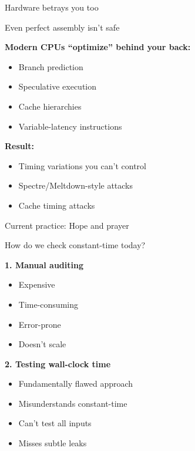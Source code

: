 \documentclass[aspectratio=169, lualatex, handout]{beamer}
\begin{document}
\begin{frame}{Hardware betrays you too}
	\begin{center}
		\Large
		Even perfect assembly isn't safe
	\end{center}
	\vspace{1em}
	\textbf{Modern CPUs ``optimize'' behind your back:}
	\begin{itemize}
		\item Branch prediction
		\item Speculative execution
		\item Cache hierarchies
		\item Variable-latency instructions
	\end{itemize}
	\vspace{0.5em}
	\textbf{Result:}
	\begin{itemize}
		\item Timing variations you can't control
		\item Spectre/Meltdown-style attacks
		\item Cache timing attacks
	\end{itemize}
\end{frame}

\begin{frame}{Current practice: Hope and prayer}
	\begin{center}
		\Large
		How do we check constant-time today?
	\end{center}
	\vspace{1em}
	\textbf{1. Manual auditing}
	\begin{itemize}
		\item Expensive
		\item Time-consuming
		\item Error-prone
		\item Doesn't scale
	\end{itemize}
	\vspace{0.5em}
	\textbf{2. Testing wall-clock time}
	\begin{itemize}
		\item Fundamentally flawed approach
		\item Misunderstands constant-time
		\item Can't test all inputs
		\item Misses subtle leaks
	\end{itemize}
\end{frame}
\end{document}
